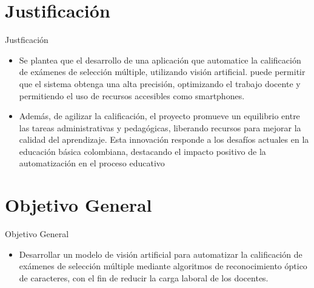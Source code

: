 \documentclass{beamer}
\begin{document}
\section{Justificación}
\begin{frame}{Justficación}
    \begin{itemize}
        \item Se  plantea que el desarrollo de una aplicación que automatice la calificación de exámenes de selección múltiple, utilizando visión artificial.  puede permitir que el sistema obtenga una alta precisión, optimizando el trabajo docente y permitiendo el uso de recursos accesibles como smartphones. 
        \item Además, de agilizar la calificación, el proyecto promueve un equilibrio entre las tareas administrativas y pedagógicas, liberando recursos para mejorar la calidad del aprendizaje. Esta innovación responde a los desafíos actuales en la educación básica colombiana, destacando el impacto positivo de la automatización en el proceso educativo
    \end{itemize}
\end{frame}

\section{Objetivo General}
\begin{frame}{Objetivo General}
    \begin{itemize}
        \item Desarrollar un modelo de visión artificial para automatizar la calificación de exámenes de selección múltiple mediante algoritmos de reconocimiento óptico de caracteres, con el fin de reducir la carga laboral de los docentes.
    \end{itemize}
\end{frame}
\end{document}
